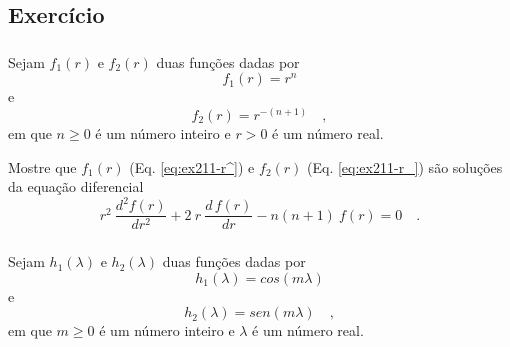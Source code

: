\documentclass[10pt,a4paper,fleqn]{article}
\begin{document}
\subsection{Exerc\'{i}cio}

\subsubsection{}

Sejam $f_{1}(r)$ e $f_{2}(r)$ duas funç\~{o}es dadas por
\begin{equation}
f_{1}(r) = r^{n}
\label{eq:ex211-r^}
\end{equation}
e
\begin{equation}
f_{2}(r) = r^{-(n+1)} \quad ,
\label{eq:ex211-r_}
\end{equation}
em que $n \geqslant 0$ \'{e} um n\'{u}mero inteiro e $r > 0$ \'{e} um n\'{u}mero real. 

\begin{flushleft}
\dotfill
\end{flushleft}

Mostre que $f_{1}(r)$ (Eq. \ref{eq:ex211-r^}) e $f_{2}(r)$ (Eq. \ref{eq:ex211-r_}) 
s\~{a}o soluç\~{o}es da equaç\~{a}o diferencial
\begin{equation}
r^{2} \: \frac{d^{2} f(r)}{d r^{2}} + 2 \: r \: \frac{d \, f(r)}{d r} - n(n+1) \: f(r) = 0 \quad .
\label{eq:ex211-eqdif-r}
\end{equation}

\begin{flushleft}
\dotfill
\end{flushleft}

\subsubsection{}

Sejam $h_{1}(\lambda)$ e $h_{2}(\lambda)$ duas funç\~{o}es dadas por
\begin{equation}
h_{1}(\lambda) = cos(m \lambda)
\label{eq:ex212-cos}
\end{equation}
e
\begin{equation}
h_{2}(\lambda) = sen(m \lambda) \quad ,
\label{eq:ex212-sen}
\end{equation}
em que $m \geqslant 0$ \'{e} um n\'{u}mero inteiro e $\lambda$ \'{e} um n\'{u}mero real. 

\begin{flushleft}
\dotfill
\end{flushleft}
\end{document}
